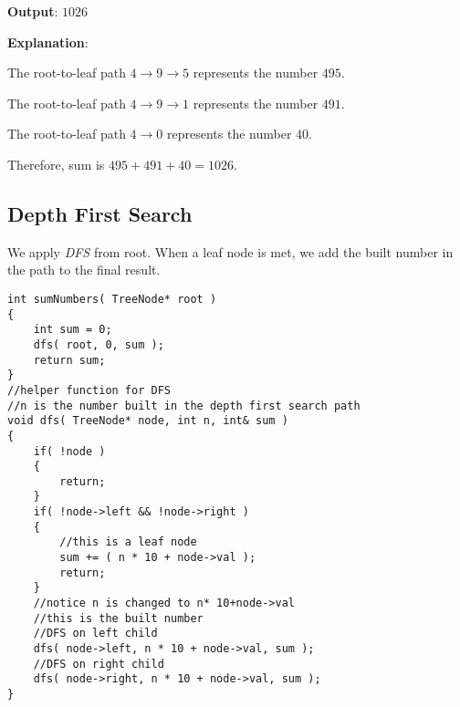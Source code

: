\begin{flushleft}
\begin{figure}[H]
\end{figure}

\textbf{Output}: $1026$

\textbf{Explanation}:

The root-to-leaf path $ 4\longrightarrow9\longrightarrow5 $ represents the number $ 495 $.

The root-to-leaf path $4\longrightarrow 9\longrightarrow 1$ represents the number $ 491 $.

The root-to-leaf path $4\longrightarrow 0$ represents the number $ 40 $.

Therefore, sum is $495 + 491 + 40 = 1026$.
\end{flushleft}

\subsection{Depth First Search}
We apply \textit{DFS} from root. When a leaf node is met, we add the built number in the path to the final result.

\setcounter{lstlisting}{0}
\begin{lstlisting}[style=customc, caption={DFS}]
int sumNumbers( TreeNode* root )
{
    int sum = 0;
    dfs( root, 0, sum );
    return sum;
}
//helper function for DFS
//n is the number built in the depth first search path
void dfs( TreeNode* node, int n, int& sum )
{
    if( !node )
    {
        return;
    }
    if( !node->left && !node->right )
    {
        //this is a leaf node
        sum += ( n * 10 + node->val );
        return;
    }
    //notice n is changed to n* 10+node->val
    //this is the built number
    //DFS on left child
    dfs( node->left, n * 10 + node->val, sum );
    //DFS on right child
    dfs( node->right, n * 10 + node->val, sum );
}
\end{lstlisting}